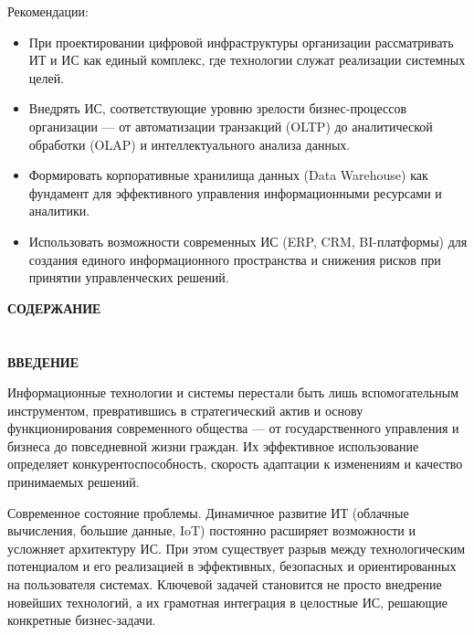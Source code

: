\documentclass{SibFU-docs}
\begin{document}
Рекомендации:

\begin{itemize}[label=-]
\item При проектировании цифровой инфраструктуры организации рассматривать ИТ и ИС как единый комплекс, где технологии служат реализации системных целей.
\item Внедрять ИС, соответствующие уровню зрелости бизнес-процессов организации — от автоматизации транзакций (OLTP) до аналитической обработки (OLAP) и интеллектуального анализа данных.
\item Формировать корпоративные хранилища данных (Data Warehouse) как фундамент для эффективного управления информационными ресурсами и аналитики.
\item Использовать возможности современных ИС (ERP, CRM, BI-платформы) для создания единого информационного пространства и снижения рисков при принятии управленческих решений.
\end{itemize}

\newpage

\thispagestyle{empty}
\begin{center}
\bfseries СОДЕРЖАНИЕ
\end{center}
\vspace{-6pt}
\tableofcontents
\clearpage

\section*{}
\vspace*{-2.5em}
\begin{center}\textbf{ВВЕДЕНИЕ}\end{center}
{}

Информационные технологии и системы перестали быть лишь вспомогательным инструментом, превратившись в стратегический актив и основу функционирования современного общества — от государственного управления и бизнеса до повседневной жизни граждан. Их эффективное использование определяет конкурентоспособность, скорость адаптации к изменениям и качество принимаемых решений.

Современное состояние проблемы. Динамичное развитие ИТ (облачные вычисления, большие данные, IoT) постоянно расширяет возможности и усложняет архитектуру ИС. При этом существует разрыв между технологическим потенциалом и его реализацией в эффективных, безопасных и ориентированных на пользователя системах. Ключевой задачей становится не просто внедрение новейших технологий, а их грамотная интеграция в целостные ИС, решающие конкретные бизнес-задачи.
\end{document}
